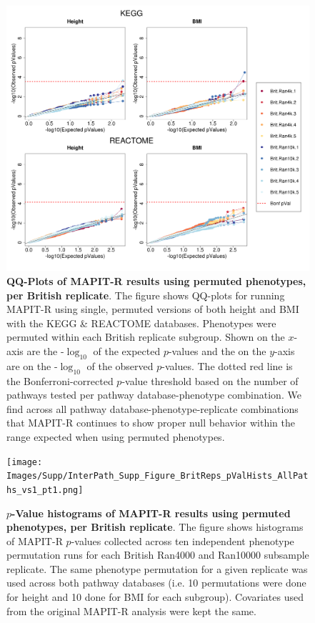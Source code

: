 \begin{figure}[htbp]
\centering
\includegraphics[scale=.35]{Images/Supp/InterPath_Supp_Figure_BritReps_perm1_QQPlots_AllPaths_vs1.png}
\caption[TBD]{\textbf{QQ-Plots of MAPIT-R results using permuted phenotypes, per British replicate}. The figure shows QQ-plots for running MAPIT-R using single, permuted versions of both height and BMI with the KEGG \& REACTOME databases. Phenotypes were permuted within each British replicate subgroup. Shown on the $x$-axis are the -$\log_{10}$ of the expected $p$-values and the on the $y$-axis are on the -$\log_{10}$ of the observed $p$-values. The dotted red line is the Bonferroni-corrected $p$-value threshold based on the number of pathways tested per pathway database-phenotype combination. We find across all pathway database-phenotype-replicate combinations that MAPIT-R continues to show proper null behavior within the range expected when using permuted phenotypes.}
\label{InterPath-Supp-Figure-BritReps-perm1-QQPlots-AllPaths}
\end{figure}
\clearpage

\setlength{\footskip}{1cm}
\begin{figure}[htbp]
\centering
\vspace*{-1cm}
\texttt{[image: Images/Supp/InterPath\_Supp\_Figure\_BritReps\_pValHists\_AllPaths\_vs1\_pt1.png]}
\caption[TBD]{\textbf{$p$-Value histograms of MAPIT-R results using permuted phenotypes, per British replicate}. The figure shows histograms of MAPIT-R $p$-values collected across ten independent phenotype permutation runs for each British Ran4000 and Ran10000 subsample replicate. The same phenotype permutation for a given replicate was used across both pathway databases (i.e. 10 permutations were done for height and 10 done for BMI for each subgroup). Covariates used from the original MAPIT-R analysis were kept the same.}
\label{InterPath-Supp-Figure-BritReps-10perms-pValHists-pt1}
\end{figure}
\clearpage
\setlength{\footskip}{1cm}
\addtocounter{figure}{-1}

